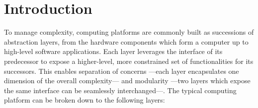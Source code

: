 \chapter{Introduction} \label{chapter:introduction}


\vspace{1cm}\noindent To manage complexity, computing platforms are commonly
built as successions of abstraction layers, from the hardware components which
form a computer up to high-level software applications.
%
Each layer leverages the interface of its predecessor to expose a higher-level,
more constrained set of functionalities for its successors.
%
This enables separation of concerns ---each layer encapsulates one dimension of
the overall complexity--- and modularity ---two layers which expose the same
interface can be seamlessly interchanged---.
%
The typical computing platform can be broken down to the following layers:
%

